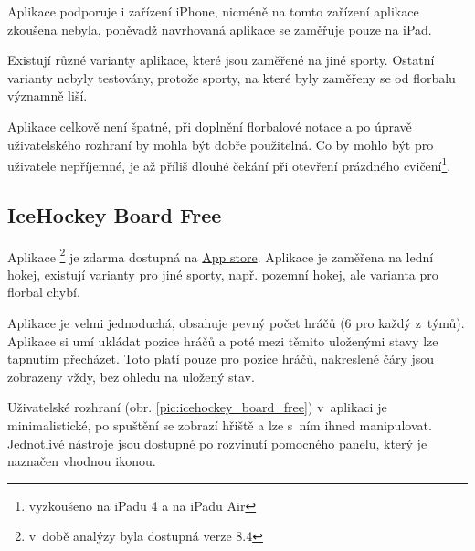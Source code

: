 \documentclass[thesis=B,czech]{FITthesis}[2012/06/26]
\begin{document}
	Aplikace podporuje i zařízení iPhone, nicméně na tomto zařízení aplikace zkoušena nebyla, poněvadž navrhovaná aplikace se zaměřuje pouze na iPad.

	Existují různé varianty aplikace, které jsou zaměřené na jiné sporty. Ostatní varianty nebyly testovány, protože sporty, na které byly zaměřeny se od florbalu významně liší.

	Aplikace celkově není špatné, při doplnění florbalové notace a po úpravě uživatelského rozhraní by mohla být dobře použitelná. Co by mohlo být pro uživatele nepříjemné, je až příliš dlouhé čekání při otevření prázdného cvičení\footnote{vyzkoušeno na iPadu 4 a na iPadu Air}.

	\subsection{IceHockey Board Free \cite{iceHockeyBoardAppstore}}

	Aplikace \footnote{v~době analýzy byla dostupná verze 8.4} je zdarma dostupná na \href{https://itunes.apple.com/ca/app/icehockey-board-free/id366079177?mt=8}{App store}. Aplikace je zaměřena na lední hokej, existují varianty pro jiné sporty, např. pozemní hokej, ale varianta pro florbal chybí.

	Aplikace je velmi jednoduchá, obsahuje pevný počet hráčů (6 pro každý z~týmů). Aplikace si umí ukládat pozice hráčů a poté mezi těmito uloženými stavy lze tapnutím přecházet. Toto platí pouze pro pozice hráčů, nakreslené čáry jsou zobrazeny vždy, bez ohledu na uložený stav.

	Uživatelské rozhraní (obr. \ref{pic:icehockey_board_free}) v~aplikaci je minimalistické, po spuštění se zobrazí hřiště a lze s~ním ihned manipulovat. Jednotlivé nástroje jsou dostupné po rozvinutí pomocného panelu, který je naznačen vhodnou ikonou.
\end{document}
